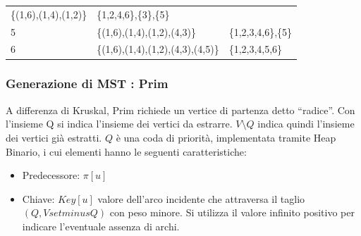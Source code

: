 \documentclass[tikz]{article}
\providecommand{\tightlist}{%
  \setlength{\itemsep}{0pt}\setlength{\parskip}{0pt}}
\begin{document}
{{\begin{longtable}[]{@{}lll@{}}
\begin{minipage}[t]{0.30\columnwidth}
{\{(1,6),(1,4),(1,2)\}}\strut
\end{minipage} & \begin{minipage}[t]{0.30\columnwidth}\raggedright\strut
{\{1,2,4,6\},\{3\},\{5\}}\strut
\end{minipage}\tabularnewline
\begin{minipage}[t]{0.30\columnwidth}\raggedright\strut
{5}\strut
\end{minipage} & \begin{minipage}[t]{0.30\columnwidth}\raggedright\strut
{\{(1,6),(1,4),(1,2),(4,3)\}}\strut
\end{minipage} & \begin{minipage}[t]{0.30\columnwidth}\raggedright\strut
{\{1,2,3,4,6\},\{5\}}\strut
\end{minipage}\tabularnewline
\begin{minipage}[t]{0.30\columnwidth}\raggedright\strut
{6}\strut
\end{minipage} & \begin{minipage}[t]{0.30\columnwidth}\raggedright\strut
{\{(1,6),(1,4),(1,2),(4,3),(4,5)\}}\strut
\end{minipage} & \begin{minipage}[t]{0.30\columnwidth}\raggedright\strut
{\{1,2,3,4,5,6\}}\strut
\end{minipage}\tabularnewline
\bottomrule
\end{longtable}

\subsubsection{Generazione di MST : Prim}

{A differenza di Kruskal, Prim richiede un vertice di partenza detto ``radice''. Con l'insieme Q si indica l'insieme dei vertici da estrarre.
$V\setminus Q$ indica quindi l'insieme dei vertici già estratti. $Q$ è una coda di priorità, implementata tramite Heap Binario, i cui elementi hanno le seguenti caratteristiche:}

\begin{itemize}
\tightlist
\item
  Predecessore: $\pi[u]$
\item
Chiave: $Key[u]$ valore dell'arco incidente che attraversa il taglio $(Q,Vsetminus Q)$ con peso minore. Si utilizza il valore infinito positivo per indicare l'eventuale assenza di archi.
\end{itemize}



}}
\end{document}
